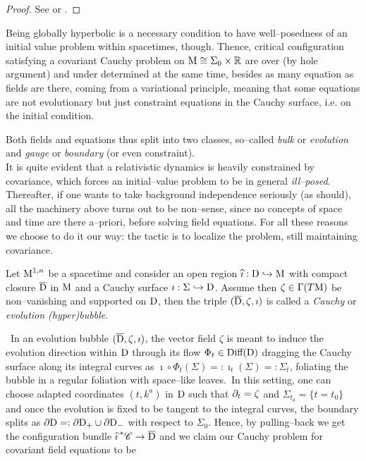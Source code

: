 \begin{proof}
    See \cite{geroch} or \cite{geroch2}.
\end{proof}

Being globally hyperbolic is a necessary condition to have well--posedness of an initial value problem within spacetimes, though. Thence, critical configuration satisfying a covariant Cauchy problem on $\text{\normalfont M}\cong\Sigma_0\times\mathbb{R}$ are over (by hole argument) and under determined at the same time, besides as many equation as fields are there, coming from a variational principle, meaning that some equations are not evolutionary but just constraint equations in the Cauchy surface, i.e. on the initial condition. %

Both fields and equations thus split into two classes, so--called \emph{bulk} or \emph{evolution} and \emph{gauge} or \emph{boundary} (or even constraint).\\

It is quite evident that a relativistic dynamics is heavily constrained by covariance, which forces an initial--value problem to be in general \emph{ill--posed}. Thereafter, if one wants to take background independence seriously (as should), all the machinery above turns out to be non--sense, since no concepts of space and time are there a--priori, before solving field equations. For all these reasons we choose to do it our way: the tactic is to localize the problem, still maintaining covariance.

\begin{defi}\label{cauchybubble}
    Let $\text{\normalfont M}^{1,n}$ be a spacetime and consider an open region $\widehat{\imath}:\text{\normalfont D}\hookrightarrow\text{\normalfont M}$ with compact closure $\overline{\text{\normalfont D}}$ in $\text{\normalfont M}$ and a Cauchy surface $\imath:\Sigma\hookrightarrow\text{\normalfont D}$. Assume then $\zeta\in\Gamma(T\text{\normalfont M})$ be non--vanishing and supported on $\text{\normalfont D}$, then the triple $(\overline{\text{\normalfont D}},\zeta,\imath)$ is called a \emph{Cauchy} or \emph{evolution (hyper)bubble}. 
\end{defi}
\,\newline
In an evolution bubble $(\overline{\text{\normalfont D}},\zeta,\imath)$, the vector field $\zeta$ is meant to induce the evolution direction within $\text{\normalfont D}$ through its flow $\Phi_t\in\text{\normalfont Diff}(\text{\normalfont D})$ dragging the Cauchy surface along its integral curves as $\imath\circ\Phi_t(\Sigma)=:\imath_t(\Sigma)=:\Sigma_t$, foliating the bubble in a regular foliation with space--like leaves.\, In this setting, one can choose adapted coordinates $(t,k^a)$ in $\text{\normalfont D}$ such that $\partial_t=\zeta$ and $\Sigma_{t_0}=\{t=t_0\}$ and once the evolution is fixed to be tangent to the integral curves, the boundary splits as $\partial\text{\normalfont D}=:\partial\text{\normalfont D}_+\cup\partial\text{\normalfont D}_-$ with respect to $\Sigma_0$. %
Hence, by pulling--back we get the configuration bundle ${\widehat{\imath}\,}^*\mathscr{C}\to\overline{\text{\normalfont D}}$ and we claim our Cauchy problem for covariant field equations to be

